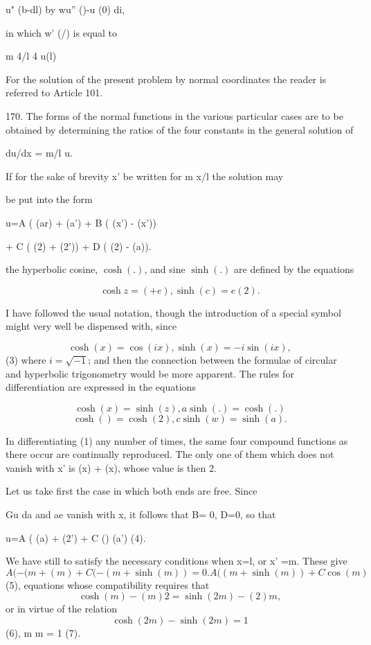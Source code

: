 u" (b-dl) by wu'' ()-u (0) di,

in which w' (/) is equal to

m 4/l 4 u(l)

For the solution of the present problem by normal coordinates the reader
is referred to Article 101.

170. The forms of the normal functions in the various particular cases
are to be obtained by determining the ratios of the four constants in
the general solution of

du/dx = m/l u.

If for the sake of brevity x' be written for m x/l the solution may

be put into the form

u=A ( (ar) + (a') + B ( (x') - (x'))

+ C ( (2) + (2')) + D ( (2) - (a)).

the hyperbolic cosine, \(\cosh(.)\), and sine \(\sinh(.)\)
are defined by the equations

\[\cosh z=( +e), \sinh(c)= e (2).\]

I have followed the usual notation, though the introduction of a special
symbol might very well be dispensed with, since

\[\cosh(x)  =\cos(i x), \sinh(x) =- i \sin(ix),\]
(3) where \(i=\sqrt{-1}\); and then the connection between the formulae of
circular and hyperbolic trigonometry would be more apparent. The rules
for differentiation are expressed in the equations

\[\cosh(x) = \sinh(z), a \sinh(.)  = \cosh(.) \]
\[\cosh() = \cosh(2), c \sinh(w) = \sinh(a) .\]

In differentiating (1) any number of times, the same four compound
functions as there occur are continually reproduced. The only one of
them which does not vanish with x' is (x) + (x), whose value is then 2.

Let us take first the case in which both ends are free. Since

Gu da and ae vanish with x, it follows that B= 0, D=0, so that

u=A ( (a) + (2') + C () (a') (4).

We have still to satisfy the necessary conditions when x=l, or x' =m.
These give
\[ A (- (m + (m) + C (- (m + \sinh(m)) = 0 . A( (m+ \sinh(m))+ C \cos(m) \]
(5),
equations whose compatibility requires that
\[ \cosh( m) - (m)2 = \sinh( 2 m) - (2) m, \]
or in virtue of the relation
\[ \cosh(2 m) - \sinh( 2 m) = 1 \]
(6),
m m = 1
(7).

